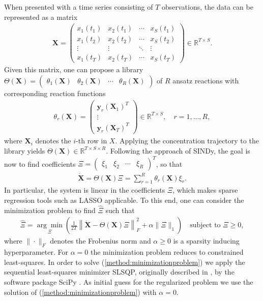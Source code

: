 \documentclass[oneside, abstracton, titlepage]{scrartcl}
\begin{document}
	When presented with a time series consisting of $T$ observations, the data can be represented as a matrix
	\begin{align}
	\textbf{X} = \begin{pmatrix}
		x_1(t_1) & x_2(t_1) & \cdots & x_S(t_1) \\
		x_1(t_2) & x_2(t_2) & \cdots & x_S(t_2) \\
		\vdots   & \vdots   & \ddots & \vdots   \\
		x_1(t_T) & x_2(t_T) & \cdots & x_S(t_T)
	\end{pmatrix} \in \mathbb{R}^{T\times S}.
	\end{align}
	Given this matrix, one can propose a library $\Theta(\textbf{X}) = \begin{pmatrix} \theta_1(\textbf{X}) & \theta_2(\textbf{X}) & \cdots & \theta_R(\textbf{X}) \end{pmatrix}$ of $R$ ansatz reactions with corresponding reaction functions
	\begin{align}
		\theta_r(\textbf{X}) = \begin{pmatrix}
		\textbf{y}_r(\textbf{X}_1)^T \\ \vdots \\ \textbf{y}_r(\textbf{X}_T)^T
		\end{pmatrix}\in \mathbb{R}^{T\times S},\quad r=1,\ldots,R,
	\label{method:the-reactions}\end{align}
	where $\textbf{X}_i$ denotes the $i$-th row in $X$. Applying the concentration trajectory to the library yields $\Theta(\textbf{X})\in\mathbb{R}^{T\times S\times R}$. Following the approach of SINDy, the goal is now to find coefficients $\Xi = \begin{pmatrix} \xi_1 & \xi_2 & \cdots & \xi_R
	\end{pmatrix}^T$, so that
	\begin{align}
	\dot{\textbf{X}} = \Theta(\textbf{X})\Xi = \sum_{r=1}^{R}\theta_r(\textbf{X})\xi_r.
	\end{align}
	In particular, the system is linear in the coefficients $\Xi$, which makes sparse regression tools such as LASSO \cite{Tibshirani1996, Hastie2009} applicable. To this end, one can consider the minimization problem to find $\hat{\Xi}$ such that
	\begin{align}
		\hat{\Xi} = \underset{\Xi}{\arg\min}\left( \frac{1}{2T}\left\| \dot{\textbf{X}} - \Theta(\textbf{X})\Xi \right\|_F^2 + \alpha\|\Xi\|_1 \right) \quad \text{subject to }\Xi \geq 0,
	\label{method:minimizationproblem}\end{align}
	where $\|\cdot\|_F$ denotes the Frobenius norm and $\alpha\geq 0$ is a sparsity inducing hyperparameter. For $\alpha=0$ the minimization problem reduces to constrained least-squares. In order to solve (\ref{method:minimizationproblem}) we apply the sequential least-squares minimizer SLSQP, originally described in \cite{Kraft1988}, by the software package SciPy \cite{SciPy}. As initial guess for the regularized problem we use the solution of (\ref{method:minimizationproblem}) with $\alpha=0$.
	
\end{document}
